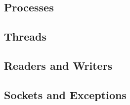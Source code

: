\documentclass{article}
\begin{document}
    \subsection{Processes}
    \subsection{Threads}
    \subsection{Readers and Writers}
    \subsection{Sockets and Exceptions}
   
\end{document}
